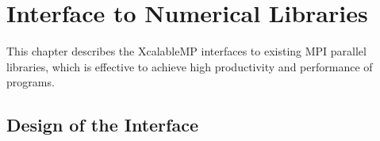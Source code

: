 









\chapter{Interface to Numerical Libraries}
\label{chap:Interface to Numerical Libraries}

   This chapter describes the XcalableMP interfaces to existing MPI
   parallel libraries, which is effective to achieve high productivity
   and performance of {\XMP} programs.
   
\section{Design of the Interface}

